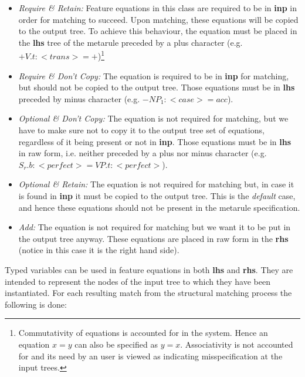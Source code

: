 \begin{itemize}
\item   {\it Require \& Retain:} Feature equations in this class
        are required to be in {\bf inp} in order for matching to succeed.
        Upon matching, these equations will be copied to the output tree.
        To achieve this behaviour, the equation must be placed in 
        the {\bf lhs} tree of the metarule preceded by a plus character
        (e.g. $+V.t:<trans>=+$)\footnote{Commutativity of equations is 
        accounted for in the system. Hence an equation $x=y$ can also be
        specified as $y=x$. Associativity is not accounted for and its need by
        an user is viewed as indicating misspecification at the input trees.}
        
\item   {\it Require \& Don't Copy:} The equation is required to be in 
        {\bf inp}
        for matching, but should not be copied to the output tree.
        Those equations must be in {\bf lhs} preceded by minus character
        (e.g. $-NP_1:<case>=acc$).

\item   {\it Optional \& Don't Copy:} 
        The equation is not required for matching,
        but we have to make sure not to copy it to the output tree set of
        equations, regardless of it being present or not in {\bf inp}.
        Those equations must be in {\bf lhs} in raw form, i.e. neither preceded
        by a plus nor minus character
        (e.g. $S_r.b:<perfect>=VP.t:<perfect>$).

\item   {\it Optional \& Retain:} 
        The equation is not required for matching but,
        in case it is found in {\bf inp} it must be copied to the output tree.
        This is the {\it default} case, and hence these equations should not be
        present in the metarule specification.

\item   {\it Add:} The equation is not required for matching but we want it to
        be put in the output tree anyway.
        These equations are placed in raw form in the {\bf rhs} (notice in this
        case it is the right hand side).
\end{itemize}

Typed variables can be used in feature equations in both {\bf lhs} and 
{\bf rhs}. They are intended to represent the nodes of the input tree to which
they have been instantiated. For each resulting match 
from the structural matching process the following is done:

